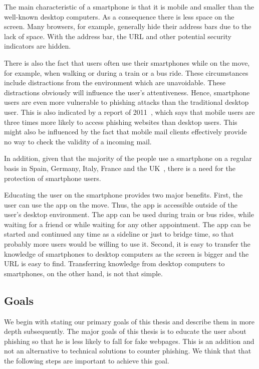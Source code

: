 \begin{description}[leftmargin=0cm]
	\item[Mobility and Size] The main characteristic of a smartphone is that it is mobile and smaller than the well-known desktop computers.
 As a consequence there is less space on the screen.
 Many browsers, for example, generally hide their address bars due to the lack of space.
 With the address bar, the URL and other potential security indicators are hidden.
	\item[Distraction Caused by Mobility] There is also the fact that users often use their smartphones while on the move, for example, when walking or  during a train or a bus ride.
 These circumstances include distractions from the environment which are unavoidable.
 These distractions obviously will influence the user's attentiveness.
 Hence, smartphone users are even more vulnerable to phishing attacks than the traditional desktop user.
 This is also indicated by a report of 2011~\cite{trusteer2011}, which says that mobile users are three times more likely to access phishing websites than desktop users.
 This might also be influenced by the fact that mobile mail clients effectively provide no way to check the validity of a incoming mail.
	\item[High Number of Smartphone Users] In addition, given that the majority of the people use a smartphone on a regular basis in Spain, Germany, Italy, France and the UK~\cite{smartphoneusage}, there is a need for the protection of smartphone users.
	\item[Benefits of Education on the Smartphone] Educating the user on the smartphone provides two major benefits.
 First, the user can use the app on the move.
 Thus, the app is accessible outside of the user's desktop environment.
 The app can be used during train or bus rides, while waiting for a friend or while waiting for any other appointment.
 The app can be started and continued any time as a sideline or just to bridge time, so that probably more users would be willing to use it.
 Second, it is easy to transfer the knowledge of smartphones to desktop computers as the screen is bigger and the URL is easy to find.
 Transferring knowledge from desktop computers to smartphones, on the other hand, is not that simple.
\end{description} 
 
\subsection{Goals}
\label{s:goals}
We begin with stating our primary goals of this thesis and describe them in more depth subsequently.
The major goals of this thesis is to educate the user about phishing so that he is less likely to fall for fake webpages.
 This is an addition and not an alternative to technical solutions to counter phishing.
 We think that that the following steps are important to achieve this goal.


